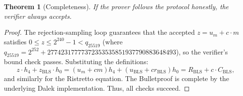 \documentclass[11pt]{article}
\theoremstyle{definitionstyle}
\newtheorem{theorem}{Theorem}[section]
\theoremstyle{plain}
\begin{document}
\begin{theorem}[Completeness]
If the prover follows the protocol honestly, the verifier always accepts.
\end{theorem}
\begin{proof}
The rejection-sampling loop guarantees that the accepted $z = u_m + c \cdot m$ satisfies $0 \le z \le 2^{240}-1 < q_{25519}$ (where $q_{25519} = 2^{252} + 27742317777372353535851937790883648493$), so the verifier's bound check passes. Substituting the definitions:
\[
z \cdot h_4 + z_{\text{BLS}} \cdot h_0 = (u_m + c m) h_4 + (u_{\text{BLS}} + c r_{\text{BLS}}) h_0 = R_{\text{BLS}} + c \cdot C_{\text{BLS}},
\]
and similarly for the Ristretto equation. The Bulletproof is complete by the underlying Dalek implementation. Thus, all checks succeed.
\end{proof}
\end{document}
